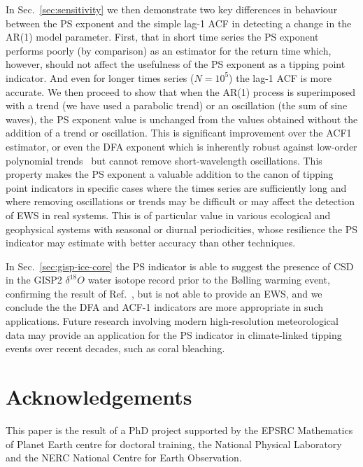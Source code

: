 \documentclass[10pt]{iopart}
\newcommand{\revision}[1]{\color{red} {#1}}
\begin{document}
In Sec.~\ref{sec:sensitivity} we then demonstrate two key differences in behaviour between the PS exponent and the simple lag-1 ACF in detecting a change in the AR(1) model parameter. First, that in short time series the PS exponent performs poorly (by comparison) as an estimator for the return time which, however, should not affect the usefulness of the PS exponent as a tipping point indicator. And even for longer times series ($N=10^5$) the lag-1 ACF is more accurate. We then proceed to show that when the AR(1) process is superimposed with a trend (we have used a parabolic trend) or an oscillation (the sum of sine waves), the PS exponent value is unchanged from the values obtained without the addition of a trend or oscillation. This is significant improvement over the ACF1 estimator, or even the DFA exponent which is inherently robust against low-order polynomial trends~\cite{kantelhardt2001} but cannot remove short-wavelength oscillations. This property makes the PS exponent a valuable addition to the canon of tipping point indicators in specific cases where the times series are sufficiently long and where removing oscillations or trends may be difficult or may affect the detection of EWS in real systems. This is of particular value in various ecological and geophysical systems with seasonal or diurnal periodicities, whose resilience the PS indicator may estimate with better accuracy than other techniques. 

{\revision
In Sec.~\ref{sec:gisp-ice-core} the PS indicator is able to suggest the presence of CSD in the GISP2 $\delta^{18}O$ water isotope record prior to the B\o{}lling warming event, confirming the result of Ref.~\cite{lenton2012climate}, but is not able to provide an EWS, and we conclude the the DFA and ACF-1 indicators are more appropriate in such applications. Future research involving modern high-resolution meteorological data may provide an application for the PS indicator in climate-linked tipping events over recent decades, such as coral bleaching. }

%


\section*{Acknowledgements}
\label{sec:Acknowledgements}

This paper is the result of a PhD project supported by the EPSRC Mathematics of Planet Earth centre for doctoral training, the National Physical Laboratory and the NERC National Centre for Earth Observation.


\vspace{0.5cm}


\end{document}
